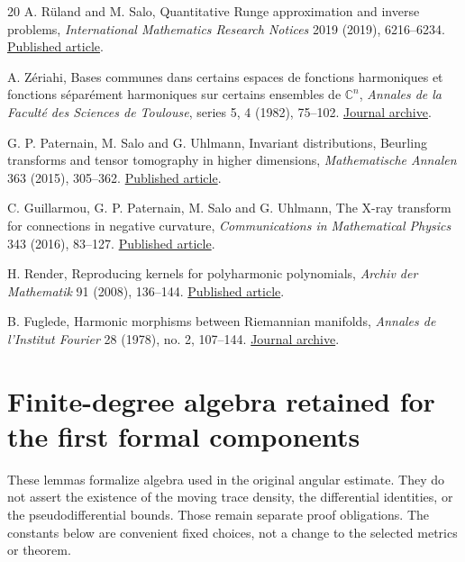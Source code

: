\documentclass[11pt]{article}
\theoremstyle{definition}
\theoremstyle{remark}
\numberwithin{equation}{section}
\begin{document}
\begin{thebibliography}{20}
A. R\"uland and M. Salo, Quantitative Runge approximation and inverse
problems, \emph{International Mathematics Research Notices} 2019 (2019),
6216--6234. \href{https://doi.org/10.1093/imrn/rnx301}{Published article}.

A. Z\'eriahi, Bases communes dans certains espaces de fonctions
harmoniques et fonctions s\'epar\'ement harmoniques sur certains ensembles
de $\mathbb C^n$, \emph{Annales de la Facult\'e des Sciences de Toulouse},
series 5, 4 (1982), 75--102.
\href{https://doi.org/10.5802/afst.575}{Journal archive}.

G. P. Paternain, M. Salo and G. Uhlmann, Invariant distributions,
Beurling transforms and tensor tomography in higher dimensions,
\emph{Mathematische Annalen} 363 (2015), 305--362.
\href{https://doi.org/10.1007/s00208-015-1169-0}{Published article}.

C. Guillarmou, G. P. Paternain, M. Salo and G. Uhlmann, The X-ray
transform for connections in negative curvature,
\emph{Communications in Mathematical Physics} 343 (2016), 83--127.
\href{https://doi.org/10.1007/s00220-015-2510-x}{Published article}.

H. Render, Reproducing kernels for polyharmonic polynomials,
\emph{Archiv der Mathematik} 91 (2008), 136--144.
\href{https://doi.org/10.1007/s00013-008-2447-9}{Published article}.

B. Fuglede, Harmonic morphisms between Riemannian manifolds,
\emph{Annales de l'Institut Fourier} 28 (1978), no. 2, 107--144.
\href{https://doi.org/10.5802/aif.691}{Journal archive}.
\end{thebibliography}

\section{Finite-degree algebra retained for the first formal components}
\label{formal-components:angular}

These lemmas formalize algebra used in the original angular estimate. They
do not assert the existence of the moving trace density, the differential
identities, or the pseudodifferential bounds. Those remain separate proof
obligations. The constants below are convenient fixed choices, not a change
to the selected metrics or theorem.
\end{document}
